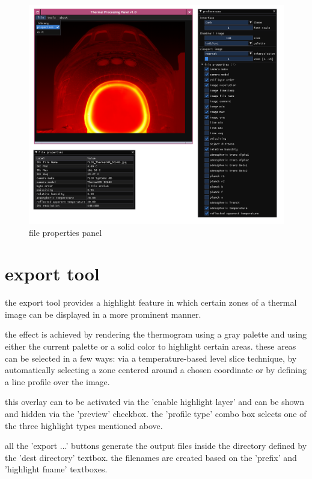 \documentclass[12pt,twoside,a4paper,notitlepage]{report}
\begin{document}
\begin{figure}[ht]
 \centering
 \includegraphics[width=14cm, keepaspectratio=true]{img/file_properties}
 \caption{file properties panel}
 \label{fig:file-properties-overview}
\end{figure}


\section{export tool} \label{sec:tools-export}

the export tool provides a highlight feature in which certain zones of a thermal image can be displayed in a more prominent manner.

the effect is achieved by rendering the thermogram using a gray palette and using either the current palette or a solid color to highlight certain areas. these areas can be selected in a few ways: via a temperature-based level slice technique, by automatically selecting a zone centered around a chosen coordinate or by defining a line profile over the image.

this overlay can to be activated via the 'enable highlight layer' and can be shown and hidden via the 'preview' checkbox. the 'profile type' combo box selects one of the three highlight types mentioned above.

all the 'export ...' buttons generate the output files inside the directory defined by the 'dest directory' textbox. the filenames are created based on the 'prefix' and 'highlight fname' textboxes.
\end{document}
